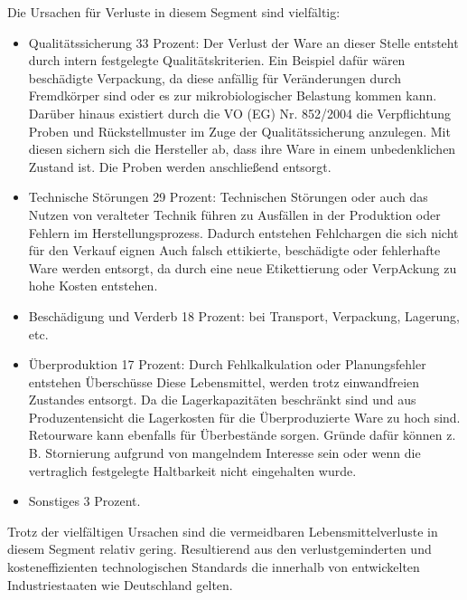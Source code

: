 Die Ursachen für Verluste in diesem Segment sind vielfältig: 
\begin{itemize}
  \item Qualitätssicherung 33 Prozent: Der Verlust der Ware an dieser Stelle entsteht durch intern festgelegte Qualitätskriterien. Ein Beispiel dafür wären beschädigte Verpackung, da diese anfällig für Veränderungen durch Fremdkörper sind oder es zur mikrobiologischer Belastung kommen kann. Darüber hinaus existiert durch die VO (EG) Nr. 852/2004 die Verpflichtung Proben und Rückstellmuster im Zuge der Qualitätssicherung anzulegen. Mit diesen sichern sich die Hersteller ab, dass ihre Ware in einem unbedenklichen Zustand ist. Die Proben werden anschließend entsorgt. %
  \item Technische Störungen 29 Prozent: Technischen Störungen oder auch das Nutzen von veralteter Technik führen zu Ausfällen in der Produktion oder Fehlern im Herstellungsprozess. Dadurch entstehen Fehlchargen die sich nicht für den Verkauf eignen %
  Auch falsch ettikierte, beschädigte oder fehlerhafte Ware werden entsorgt, da durch eine neue Etikettierung oder VerpAckung zu hohe Kosten entstehen. %
  \item Beschädigung und Verderb 18 Prozent: bei Transport, Verpackung, Lagerung, etc. %
  \item Überproduktion 17 Prozent: Durch Fehlkalkulation oder Planungsfehler entstehen Überschüsse %
 Diese Lebensmittel, werden trotz einwandfreien Zustandes entsorgt. Da die Lagerkapazitäten beschränkt sind und aus Produzentensicht die Lagerkosten für die Überproduzierte Ware zu hoch sind. %
 Retourware kann ebenfalls für Überbestände sorgen. Gründe dafür können z. B. Stornierung aufgrund von mangelndem Interesse sein oder wenn die vertraglich festgelegte Haltbarkeit nicht eingehalten wurde. %
  \item Sonstiges 3 Prozent. \end{itemize}

 
Trotz der vielfältigen Ursachen sind die vermeidbaren Lebensmittelverluste in diesem Segment relativ gering. Resultierend aus den  verlustgeminderten und kosteneffizienten technologischen Standards die innerhalb von entwickelten Industriestaaten wie Deutschland gelten. %


